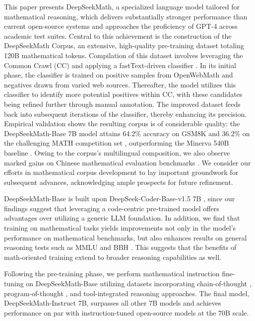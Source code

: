 This paper presents DeepSeekMath, a specialized language model tailored for mathematical reasoning, which delivers substantially stronger performance than current open-source systems and approaches the proficiency of GPT-4 across academic test suites. Central to this achievement is the construction of the DeepSeekMath Corpus, an extensive, high-quality pre-training dataset totaling 120B mathematical tokens. Compilation of this dataset involves leveraging the Common Crawl (CC) and applying a fastText-driven classifier \citep{joulin2016fasttext}. In its initial phase, the classifier is trained on positive samples from OpenWebMath \citep{openwebmath} and negatives drawn from varied web sources. Thereafter, the model utilizes this classifier to identify more potential positives within CC, with these candidates being refined further through manual annotation. The improved dataset feeds back into subsequent iterations of the classifier, thereby enhancing its precision. Empirical validation shows the resulting corpus is of considerable quality: the DeepSeekMath-Base 7B model attains 64.2\% accuracy on GSM8K \citep{gsm8k} and 36.2\% on the challenging MATH competition set \citep{MATH}, outperforming the Minerva 540B baseline \citep{minerva}. Owing to the corpus’s multilingual composition, we also observe marked gains on Chinese mathematical evaluation benchmarks \citep{wei2023cmath,agieval}. We consider our efforts in mathematical corpus development to lay important groundwork for subsequent advances, acknowledging ample prospects for future refinement.

DeepSeekMath-Base is built upon DeepSeek-Coder-Base-v1.5 7B \citep{deepseek-coder}, since our findings suggest that leveraging a code-centric pre-trained model offers advantages over utilizing a generic LLM foundation. In addition, we find that training on mathematical tasks yields improvements not only in the model's performance on mathematical benchmarks, but also enhances results on general reasoning tests such as MMLU \citep{mmlu} and BBH \citep{bbh}. This suggests that the benefits of math-oriented training extend to broader reasoning capabilities as well.

Following the pre-training phase, we perform mathematical instruction fine-tuning on DeepSeekMath-Base utilizing datasets incorporating chain-of-thought \citep{cot}, program-of-thought \citep{pot,pal}, and tool-integrated reasoning \citep{tora} approaches. The final model, DeepSeekMath-Instruct 7B, surpasses all other 7B models and achieves performance on par with instruction-tuned open-source models at the 70B scale.

